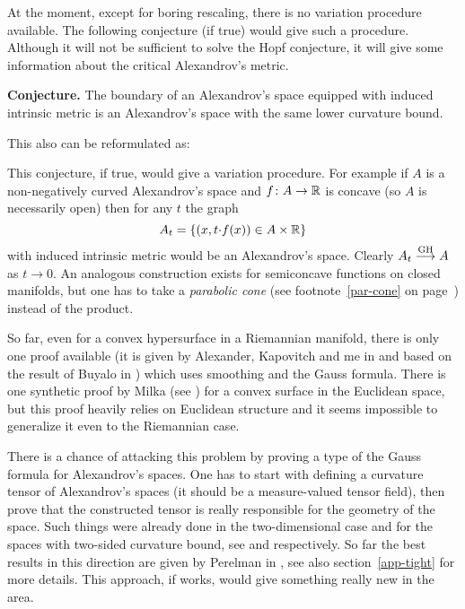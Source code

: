 \documentclass{article}
\begin{document}
At the moment, except for boring rescaling, there is no variation procedure available.
The following conjecture (if true) would give such a procedure.
Although it will not be sufficient to solve the Hopf conjecture, it will give some information about the critical Alexandrov's metric.

\begin{thm}{\bf Conjecture.}\label{conj:bry}
The boundary of an Alexandrov's space equipped with induced intrinsic metric is an
Alexandrov's space with the same lower curvature bound.
\end{thm}

This also can be reformulated as:

\bigskip


\bigskip

This conjecture, if true, would give a variation procedure. 
For example if $A$ is a non-negatively curved Alexandrov's space and $f\colon A\to\mathbb{R}$ is concave (so $A$ is necessarily open) then for any $t$ the graph
$$A_t
=
\{(x,t{\cdot} f(x))\in A\times\mathbb{R}\}$$
with induced intrinsic metric would be an Alexandrov's space. 
Clearly $A_t\GHto A$ as $t\to0$. 
An analogous construction exists for semiconcave functions on closed manifolds, but
one has to take a \emph{parabolic cone} 
(see footnote~\ref{par-cone} on page~\pageref{par-cone}) 
instead of the product.


So far, even for a convex hypersurface in a Riemannian manifold, there is only one proof available (it is given by Alexander, Kapovitch and me in \cite{akp} 
and based on the result of Buyalo in \cite{buyalo:convex-surface}) 
which uses smoothing and the Gauss formula. 
There is one synthetic proof by Milka
(see \cite{milka-conv}) for a convex surface in the Euclidean space, but this proof heavily relies on Euclidean
structure and it seems impossible to generalize it even to the Riemannian case.

There is a chance of attacking this problem by proving a type of the Gauss formula for
Alexandrov's spaces. 
One has to start with defining a curvature tensor of Alexandrov's spaces (it
should be a measure-valued tensor field), then prove that the constructed tensor is really responsible for the geometry of the space. 
Such things were already done in the two-dimensional case 
and for the spaces with two-sided curvature bound, 
see \cite{reshetnyak:curvature} and
\cite{nikolaev:curvature} respectively.
So far the best results in this direction are given by Perelman in \cite{perelman:DC}, see also section~\ref{app-tight} for more details.
This approach, if works, would give something really new in the area.
\end{document}
